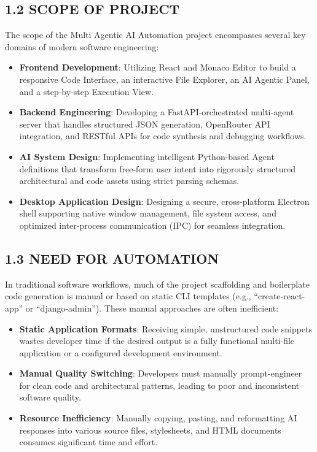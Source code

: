\documentclass[
  12pt,
]{article}
\providecommand{\tightlist}{%
  \setlength{\itemsep}{0pt}\setlength{\parskip}{0pt}}
\begin{document}
\subsection{1.2 SCOPE OF PROJECT}\label{scope-of-project}

The scope of the Multi Agentic AI Automation project encompasses several
key domains of modern software engineering:

\begin{itemize}
\tightlist
\item
  \textbf{Frontend Development}: Utilizing React and Monaco Editor to
  build a responsive Code Interface, an interactive File Explorer, an AI
  Agentic Panel, and a step-by-step Execution View.
\item
  \textbf{Backend Engineering}: Developing a FastAPI-orchestrated
  multi-agent server that handles structured JSON generation, OpenRouter
  API integration, and RESTful APIs for code synthesis and debugging
  workflows.
\item
  \textbf{AI System Design}: Implementing intelligent Python-based Agent
  definitions that transform free-form user intent into rigorously
  structured architectural and code assets using strict parsing schemas.
\item
  \textbf{Desktop Application Design}: Designing a secure,
  cross-platform Electron shell supporting native window management,
  file system access, and optimized inter-process communication (IPC)
  for seamless integration.
\end{itemize}

\subsection{1.3 NEED FOR AUTOMATION}\label{need-for-automation}

In traditional software workflows, much of the project scaffolding and
boilerplate code generation is manual or based on static CLI templates
(e.g., ``create-react-app'' or ``django-admin''). These manual
approaches are often inefficient:

\begin{itemize}
\tightlist
\item
  \textbf{Static Application Formats}: Receiving simple, unstructured
  code snippets wastes developer time if the desired output is a fully
  functional multi-file application or a configured development
  environment.
\item
  \textbf{Manual Quality Switching}: Developers must manually
  prompt-engineer for clean code and architectural patterns, leading to
  poor and inconsistent software quality.
\item
  \textbf{Resource Inefficiency}: Manually copying, pasting, and
  reformatting AI responses into various source files, stylesheets, and
  HTML documents consumes significant time and effort.
\end{itemize}
\end{document}
